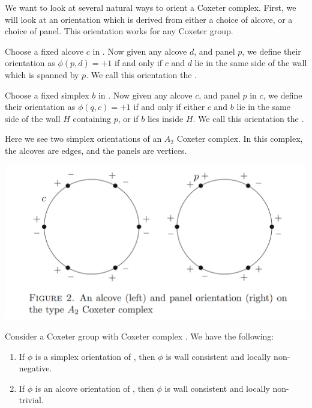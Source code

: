 \documentclass[11pt]{article}
\begin{document}
We want to look at several natural ways to orient a Coxeter complex. First, we will look at an orientation which is derived from either a choice of alcove, or a choice of panel. This orientation works for any Coxeter group.

\begin{definition}
    Choose a fixed alcove $c$ in \sg. Now given any alcove $d$, and panel $p$, we define their orientation as $\phi(p,d)=+1$ if and only if $c$ and $d$ lie in the same side of the wall which is spanned by $p$. We call this orientation the .
\end{definition}

\begin{definition}
    Choose a fixed simplex $b$ in \sg. Now given any alcove $c$, and panel $p$ in $c$, we define their orientation as $\phi(q,c)=+1$ if and only if either $c$ and $b$ lie in the same side of the wall $H$ containing $p$, or if $b$ lies inside $H$. We call this orientation the .
\end{definition}
\begin{example}
    Here we see two simplex orientations of an $A_2$ Coxeter complex. In this complex, the alcoves are edges, and the panels are vertices.
\end{example}
\includegraphics[scale=0.6]{Screenshot 2023-02-03 102201.png}\\
\begin{lemma}
    Consider a Coxeter group \W with Coxeter complex \sg. We have the following:
    \begin{enumerate}
        \item If $\phi$ is a simplex orientation of \sg, then $\phi$ is wall consistent and locally non-negative.
        \item If $\phi$ is an alcove orientation of \sg, then $\phi$ is wall consistent and locally non-trivial.
    \end{enumerate}
\end{lemma}
\end{document}
